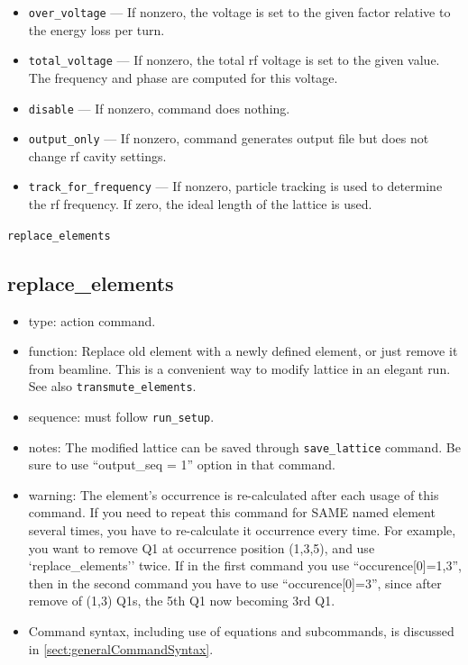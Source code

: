 \documentclass[11pt]{article}
\begin{document}
\begin{itemize}
\begin{equation}
\end{equation} 
where $U_0$ is the energy loss per turn, $\alpha$ is the momentum compaction factor, $h$ is the harmonic, 
$E$ is the beam energy, 
\begin{equation}
F(q) = 2 \left(\sqrt{q^2-1} - \arccos \frac{1}{q}\right),
\end{equation}
and $q$ is the overvoltage factor, related to the rf voltage by $q = V/U_0$. (See Wiedemann, Vol. 1, 8.2.2.)
\item \verb|over_voltage| --- If nonzero, the voltage is set to the given factor relative to the 
energy loss per turn.
\item \verb|total_voltage| --- If nonzero, the total rf voltage is set to the given value. The frequency and
  phase are computed for this voltage.
\item \verb|disable| --- If nonzero, command does nothing.
\item \verb|output_only| --- If nonzero, command generates output file but does not change rf cavity settings.
\item \verb|track_for_frequency| --- If nonzero, particle tracking is used to determine the rf frequency. If zero,
  the ideal length of the lattice is used.
\end{itemize}

\newpage
\begin{center}{\Large\verb|replace_elements|}\end{center}
\subsection{replace\_elements \label{subsec:replaceelements}}

\begin{itemize}
\item type: action command.
\item function: Replace old element with a newly defined element, or just 
   remove it from beamline. This is a convenient way to modify lattice in an elegant run.
   See also \verb|transmute_elements|.
\item sequence: must follow \verb|run_setup|.
\item notes: 
	The modified lattice can be saved through \verb|save_lattice|
   command. Be sure to use ``output\_seq = 1'' option in that command.  
\item warning:
   The element's occurrence is re-calculated after each usage of this command. If 
   you need to repeat this command for SAME named element several times, you have to re-calculate 
   it occurrence every time. For example, you want to remove Q1 at occurrence position 
   (1,3,5), and use 
   `replace\_elements'' twice. If in the first command you use ``occurence[0]=1,3'',
   then in the second command you have to use ``occurence[0]=3'', since after remove of
   (1,3) Q1s, the 5th Q1 now becoming 3rd Q1.
\item Command syntax, including use of equations and subcommands, is discussed in \ref{sect:generalCommandSyntax}.
\end{itemize}
\end{document}
